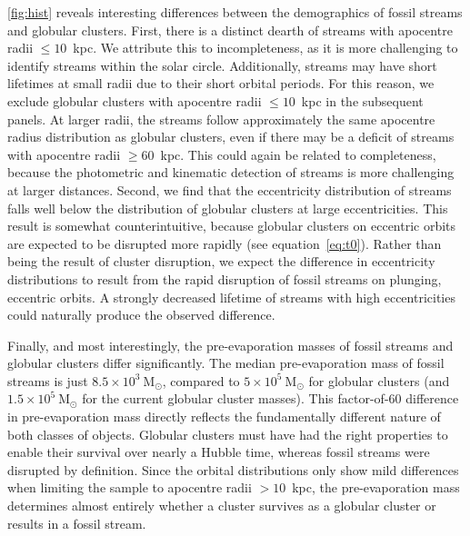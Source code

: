 \documentclass[twocolumn]{aastex63}
\newcommand{\msun}{\ensuremath{\textrm{M}_\odot}}
\begin{document}
\autoref{fig:hist} reveals interesting differences between the demographics of fossil streams and globular clusters. First, there is a distinct dearth of streams with apocentre radii $\leq10$~kpc. We attribute this to incompleteness, as it is more challenging to identify streams within the solar circle. Additionally, streams may have short lifetimes at small radii due to their short orbital periods. For this reason, we exclude globular clusters with apocentre radii $\leq10$~kpc in the subsequent panels. At larger radii, the streams follow approximately the same apocentre radius distribution as globular clusters, even if there may be a deficit of streams with apocentre radii $\geq60$~kpc. This could again be related to completeness, because the photometric and kinematic detection of streams is more challenging at larger distances. Second, we find that the eccentricity distribution of streams falls well below the distribution of globular clusters at large eccentricities. This result is somewhat counterintuitive, because globular clusters on eccentric orbits are expected to be disrupted more rapidly (see equation~\ref{eq:t0}). Rather than being the result of cluster disruption, we expect the difference in eccentricity distributions to result from the rapid disruption of fossil streams on plunging, eccentric orbits. A strongly decreased lifetime of streams with high eccentricities could naturally produce the observed difference.

Finally, and most interestingly, the pre-evaporation masses of fossil streams and globular clusters differ significantly. The median pre-evaporation mass of fossil streams is just $8.5\times10^3~\msun$, compared to $5\times10^5~\msun$ for globular clusters (and $1.5\times10^5~\msun$ for the current globular cluster masses). This factor-of-60 difference in pre-evaporation mass directly reflects the fundamentally different nature of both classes of objects. Globular clusters must have had the right properties to enable their survival over nearly a Hubble time, whereas fossil streams were disrupted by definition. Since the orbital distributions only show mild differences when limiting the sample to apocentre radii $>10$~kpc, the pre-evaporation mass determines almost entirely whether a cluster survives as a globular cluster or results in a fossil stream.
\end{document}
